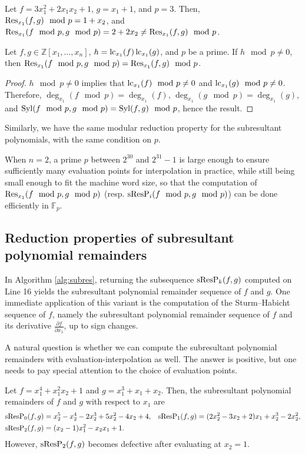 \begin{example}
    Let $f=3x_1^2+2x_1x_2+1$, $g=x_1+1$, and $p=3$. Then, $\operatorname{Res}_{x_1}(f,g)\mod p=1+x_2$, and $\operatorname{Res}_{x_1}(f\mod p,g\mod p)=2+2x_2\neq\operatorname{Res}_{x_1}(f,g)\mod p$.
\end{example}

\begin{proposition}
    Let $f,g\in\mathbb{Z}[x_1,\dots,x_n]$, $h=\operatorname{lc}_{x_1}(f)\operatorname{lc}_{x_1}(g)$, and $p$ be a prime. If $h\mod p\neq 0$, then $\operatorname{Res}_{x_1}(f\mod p,g\mod p)=\operatorname{Res}_{x_1}(f,g)\mod p$.
\end{proposition}

\begin{proof}
    $h\mod p\neq 0$ implies that $\operatorname{lc}_{x_1}(f)\mod p\neq 0$ and $\operatorname{lc}_{x_1}(g)\mod p\neq 0$. Therefore, $\deg_{x_1}(f\mod p)=\deg_{x_1}(f)$, $\deg_{x_1}(g\mod p)=\deg_{x_1}(g)$, and $\operatorname{Syl}(f\mod p,g\mod p)=\operatorname{Syl}(f,g)\mod p$, hence the result.
\end{proof}

Similarly, we have the same modular reduction property for the subresultant polynomials, with the same condition on $p$.

When $n=2$, a prime $p$ between $2^{30}$ and $2^{31}-1$ is large enough to ensure sufficiently many evaluation points for interpolation in practice, while still being small enough to fit the machine word size, so that the computation of $\operatorname{Res}_{x_1}(f\mod p, g\mod p)$ (resp. $\operatorname{sResP}_i(f\mod p, g\mod p)$) can be done efficiently in $\mathbb{F}_p$.


\subsection{Reduction properties of subresultant polynomial remainders}

In Algorithm \ref{alg:subres}, returning the subsequence $\operatorname{sResP}_k(f,g)$ computed on Line 16 yields the subresultant polynomial remainder sequence of $f$ and $g$. One immediate application of this variant is the computation of the Sturm–Habicht sequence of $f$, namely the subresultant polynomial remainder sequence of $f$ and its derivative $\frac{\partial f}{\partial x_1}$, up to sign changes.

A natural question is whether we can compute the subresultant polynomial remainders with evaluation-interpolation as well. The answer is positive, but one needs to pay special attention to the choice of evaluation points.

\begin{example}
    Let $f=x_1^4+x_1^2x_2+1$ and $g=x_1^3+x_1+x_2$. Then, the subresultant polynomial remainders of $f$ and $g$ with respect to $x_1$ are
    \begin{align*}
        \operatorname{sResP}_{0}(f,g) & =x_2^5-x_2^4-2x_2^3+5x_2^2-4x_2+4, & \operatorname{sResP}_{1}(f,g) & =(2x_2^2-3x_2+2)x_1+x_2^3-2x_2^2, \\
        \operatorname{sResP}_{2}(f,g) & =(x_2-1)x_1^2-x_2x_1+1.
    \end{align*}
    However, $\operatorname{sResP}_{2}(f,g)$ becomes defective after evaluating at $x_2=1$.
\end{example}

